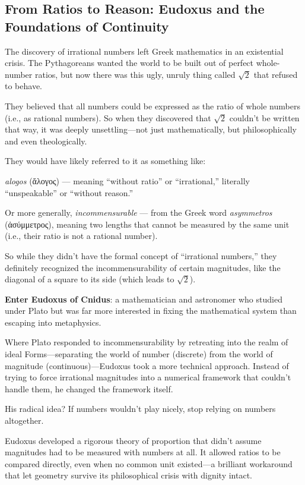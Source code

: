 \subsection{From Ratios to Reason: Eudoxus and the Foundations of Continuity}

The discovery of irrational numbers left Greek mathematics in an existential crisis. The Pythagoreans wanted the world to be built out of perfect whole-number ratios, but now there was this ugly, unruly thing called \( \sqrt{2} \) that refused to behave.

They believed that all numbers could be expressed as the ratio of whole numbers (i.e., as rational numbers). So when they discovered that \( \sqrt{2} \) couldn’t be written that way, it was deeply unsettling—not just mathematically, but philosophically and even theologically.

They would have likely referred to it as something like:

\textit{alogos} (\textgreek{ἄλογος}) — meaning “without ratio” or “irrational,” literally “unspeakable” or “without reason.”

Or more generally, \textit{incommensurable} — from the Greek word \textit{asymmetros} (\textgreek{ἀσύμμετρος}), meaning two lengths that cannot be measured by the same unit (i.e., their ratio is not a rational number).

So while they didn’t have the formal concept of “irrational numbers,” they definitely recognized the incommensurability of certain magnitudes, like the diagonal of a square to its side (which leads to \( \sqrt{2} \)).

\textbf{Enter Eudoxus of Cnidus}: a mathematician and astronomer who studied under Plato but was far more interested in fixing the mathematical system than escaping into metaphysics.

Where Plato responded to incommensurability by retreating into the realm of ideal Forms—separating the world of number (discrete) from the world of magnitude (continuous)—Eudoxus took a more technical approach. Instead of trying to force irrational magnitudes into a numerical framework that couldn’t handle them, he changed the framework itself.

His radical idea? If numbers wouldn’t play nicely, stop relying on numbers altogether.

Eudoxus developed a rigorous theory of proportion that didn’t assume magnitudes had to be measured with numbers at all. It allowed ratios to be compared directly, even when no common unit existed—a brilliant workaround that let geometry survive its philosophical crisis with dignity intact.


